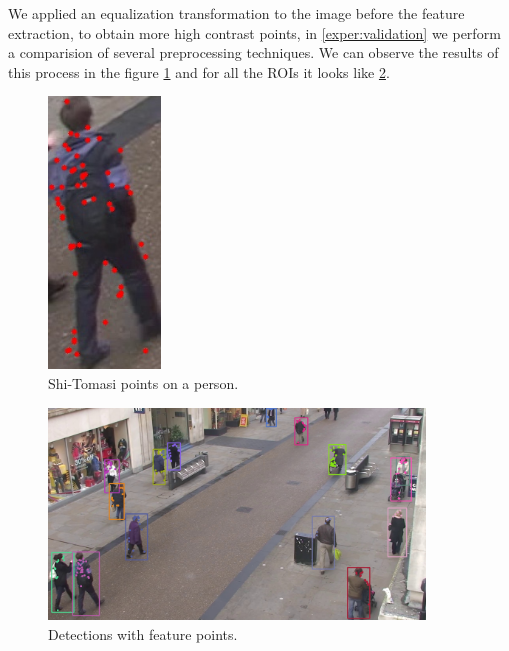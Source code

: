 We applied an equalization transformation to the image before the feature extraction, to obtain more high contrast points, in \ref{exper:validation} we perform a comparision of several preprocessing techniques. We can observe the results of this process in the figure \ref{solution2} and for all the ROIs it looks like \ref{solution3}.


\begin{figure}[H]
\centering         
\includegraphics[width=3cm]{implementation/pointsEQU.jpg}
\caption{Shi-Tomasi points on a person.} \label{solution2}
\end{figure}

%


\begin{figure}[H]
\centering         
\includegraphics[width=10cm]{intro/pounts.jpg}
\caption{Detections with feature points.} \label{solution3}
\end{figure}

